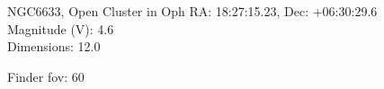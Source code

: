 \begin{block}{NGC6633, Open Cluster in Oph}
    RA: 18:27:15.23, Dec: +06:30:29.6 \\ 
    Magnitude (V): 4.6 \\ 
    Dimensions: 12.0 

    Finder fov: 60 
\end{block}